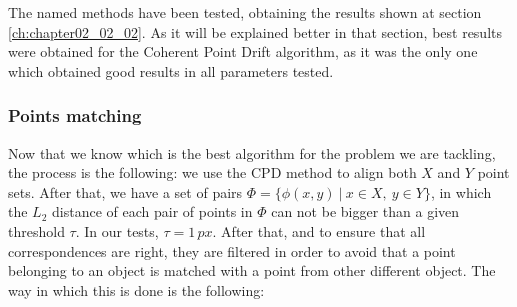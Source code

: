 The named methods have been tested, obtaining the results shown at section \ref{ch:chapter02_02_02}. As it will be explained better in that section, best results were obtained for the Coherent Point Drift algorithm, as it was the only one which obtained good results in all parameters tested.

\subsubsection{Points matching}\label{ch:chapter02_01_02_02}

Now that we know which is the best algorithm for the problem we are tackling, the process is the following: we use 
the \acf{CPD} method to align both $X$ and $Y$ point sets. After that, we have a set 
of pairs $\Phi = \{ \phi(x,y) ~|~ x \in X, ~y \in Y \}$, in which the $L_2$ distance of each pair of points in 
$\Phi$ can not be bigger than a given threshold $\tau$. In our tests, $\tau = 1\,px$. After that, and to ensure that all correspondences are right, 
they are filtered in order to avoid that a point belonging to an object is matched with a point from other different 
object. 
The way in which this is done is the following:
